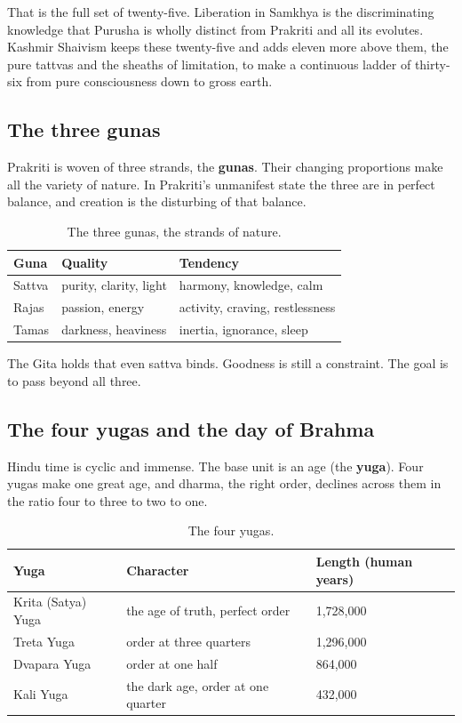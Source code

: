 That is the full set of twenty-five. Liberation in Samkhya is the discriminating knowledge that Purusha is wholly distinct from Prakriti and all its evolutes. Kashmir Shaivism keeps these twenty-five and adds eleven more above them, the pure tattvas and the sheaths of limitation, to make a continuous ladder of thirty-six from pure consciousness down to gross earth.

\subsection{The three gunas}

Prakriti is woven of three strands, the \textbf{gunas}. Their changing proportions make all the variety of nature. In Prakriti's unmanifest state the three are in perfect balance, and creation is the disturbing of that balance.

\begin{longtable}{@{} L{0.18\textwidth}L{0.34\textwidth}L{0.38\textwidth}@{}}
\caption{The three gunas, the strands of nature.}\\
\toprule
\textbf{Guna} & \textbf{Quality} & \textbf{Tendency} \\
\midrule
Sattva & purity, clarity, light & harmony, knowledge, calm \\
Rajas & passion, energy & activity, craving, restlessness \\
Tamas & darkness, heaviness & inertia, ignorance, sleep \\
\bottomrule
\end{longtable}

The Gita holds that even sattva binds. Goodness is still a constraint. The goal is to pass beyond all three.

\subsection{The four yugas and the day of Brahma}

Hindu time is cyclic and immense. The base unit is an age (the \textbf{yuga}). Four yugas make one great age, and dharma, the right order, declines across them in the ratio four to three to two to one.

\begin{longtable}{@{} L{0.24\textwidth}L{0.34\textwidth}L{0.30\textwidth}@{}}
\caption{The four yugas.}\\
\toprule
\textbf{Yuga} & \textbf{Character} & \textbf{Length (human years)} \\
\midrule
Krita (Satya) Yuga & the age of truth, perfect order & 1,728,000 \\
Treta Yuga & order at three quarters & 1,296,000 \\
Dvapara Yuga & order at one half & 864,000 \\
Kali Yuga & the dark age, order at one quarter & 432,000 \\
\bottomrule
\end{longtable}

